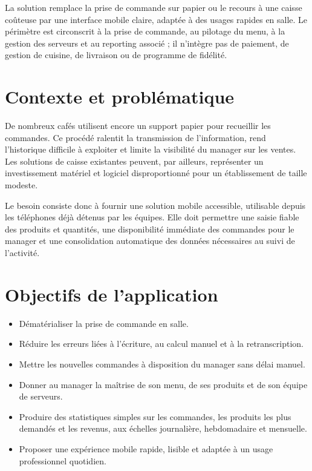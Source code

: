 \documentclass[11pt,a4paper]{article}
\begin{document}
La solution remplace la prise de commande sur papier ou le recours à une caisse coûteuse par une interface mobile claire, adaptée à des usages rapides en salle. Le périmètre est circonscrit à la prise de commande, au pilotage du menu, à la gestion des serveurs et au reporting associé ; il n’intègre pas de paiement, de gestion de cuisine, de livraison ou de programme de fidélité.

\section{Contexte et problématique}
De nombreux cafés utilisent encore un support papier pour recueillir les commandes. Ce procédé ralentit la transmission de l’information, rend l’historique difficile à exploiter et limite la visibilité du manager sur les ventes. Les solutions de caisse existantes peuvent, par ailleurs, représenter un investissement matériel et logiciel disproportionné pour un établissement de taille modeste.

Le besoin consiste donc à fournir une solution mobile accessible, utilisable depuis les téléphones déjà détenus par les équipes. Elle doit permettre une saisie fiable des produits et quantités, une disponibilité immédiate des commandes pour le manager et une consolidation automatique des données nécessaires au suivi de l’activité.

\section{Objectifs de l’application}
\begin{itemize}
  \item Dématérialiser la prise de commande en salle.
  \item Réduire les erreurs liées à l’écriture, au calcul manuel et à la retranscription.
  \item Mettre les nouvelles commandes à disposition du manager sans délai manuel.
  \item Donner au manager la maîtrise de son menu, de ses produits et de son équipe de serveurs.
  \item Produire des statistiques simples sur les commandes, les produits les plus demandés et les revenus, aux échelles journalière, hebdomadaire et mensuelle.
  \item Proposer une expérience mobile rapide, lisible et adaptée à un usage professionnel quotidien.
\end{itemize}
\end{document}
